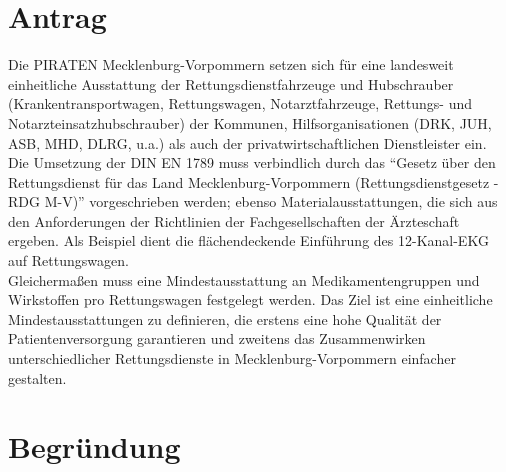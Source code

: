 \section{Antrag}

Die PIRATEN Mecklenburg-Vorpommern setzen sich für eine landesweit einheitliche Ausstattung der Rettungsdienstfahrzeuge und Hubschrauber (Krankentransportwagen, Rettungswagen, Notarztfahrzeuge, Rettungs- und Notarzteinsatzhubschrauber) der Kommunen, Hilfsorganisationen (DRK, JUH, ASB, MHD, DLRG, u.a.) als auch der privatwirtschaftlichen Dienstleister ein.\\Die Umsetzung der DIN EN 1789 muss verbindlich durch das ``Gesetz über den Rettungsdienst für das Land Mecklenburg-Vorpommern (Rettungsdienstgesetz - RDG M-V)'' vorgeschrieben werden; ebenso Materialausstattungen, die sich aus den Anforderungen der Richtlinien der Fachgesellschaften der Ärzteschaft ergeben. Als Beispiel dient die flächendeckende Einführung des 12-Kanal-EKG auf Rettungswagen.\\Gleichermaßen muss eine Mindestausstattung an Medikamentengruppen und Wirkstoffen pro Rettungswagen festgelegt werden. Das Ziel ist eine einheitliche Mindestausstattungen zu definieren, die erstens eine hohe Qualität der Patientenversorgung garantieren und zweitens das Zusammenwirken unterschiedlicher Rettungsdienste in Mecklenburg-Vorpommern einfacher gestalten.

\section{Begründung}

